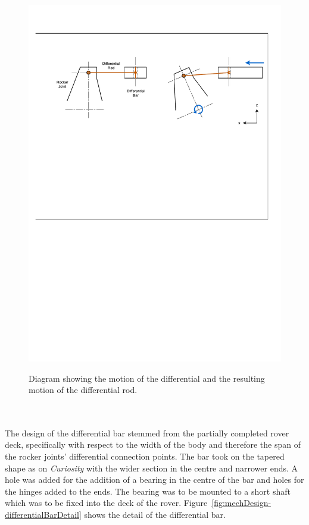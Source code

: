 \begin{figure}[h!]
{        \includegraphics[clip, trim=1cm 19cm 1.5cm 3cm, width=0.9\linewidth]{figures/mechDesign-differentialMotionSide.pdf}
      }
      \caption[Diagram showing the motion of the differential and the resulting motion of the differential rod.]{Diagram showing the motion of the differential and the resulting motion of the differential rod.}
      \label{fig:mechDesign-differentialMotion}
      \end{figure}
      
      \\\\
        The design of the differential bar stemmed from the partially completed rover deck, specifically with respect to the width of the body and therefore the span of the rocker joints' differential connection points. The bar took on the tapered shape as on \textit{Curiosity} with the wider section in the centre and narrower ends. A hole was added for the addition of a bearing in the centre of the bar and holes for the hinges added to the ends. The bearing was to be mounted to a short shaft which was to be fixed into the deck of the rover. Figure~\ref{fig:mechDesign-differentialBarDetail} shows the detail of the differential bar.
        
